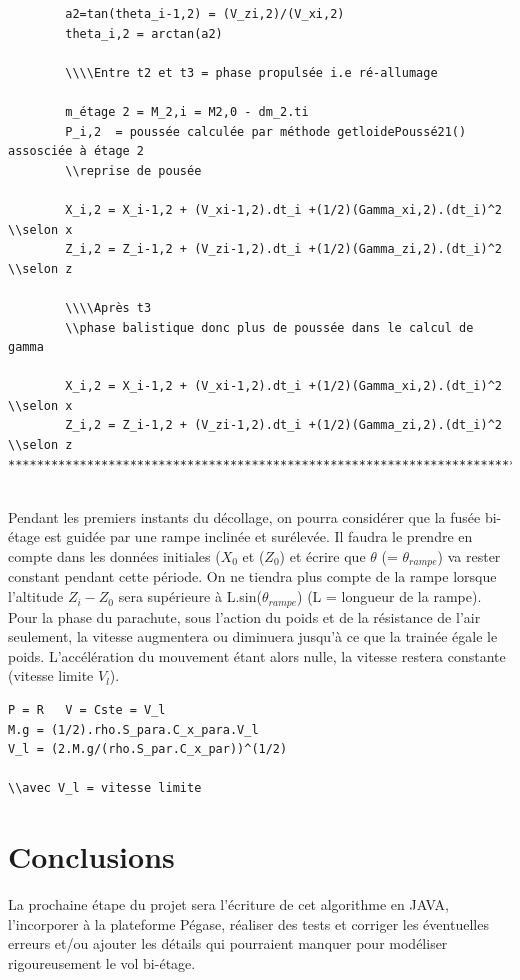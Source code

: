 \documentclass[a4paper]{article}
\begin{document}
\begin{verbatim}
		a2=tan(theta_i-1,2) = (V_zi,2)/(V_xi,2)
		theta_i,2 = arctan(a2)

		\\\\Entre t2 et t3 = phase propulsée i.e ré-allumage
		
		m_étage 2 = M_2,i = M2,0 - dm_2.ti
		P_i,2  = poussée calculée par méthode getloidePoussé21() assosciée à étage 2
		\\reprise de pousée
		
		X_i,2 = X_i-1,2 + (V_xi-1,2).dt_i +(1/2)(Gamma_xi,2).(dt_i)^2	\\selon x
		Z_i,2 = Z_i-1,2 + (V_zi-1,2).dt_i +(1/2)(Gamma_zi,2).(dt_i)^2	\\selon z
		
		\\\\Après t3
		\\phase balistique donc plus de poussée dans le calcul de gamma
		
		X_i,2 = X_i-1,2 + (V_xi-1,2).dt_i +(1/2)(Gamma_xi,2).(dt_i)^2	\\selon x
		Z_i,2 = Z_i-1,2 + (V_zi-1,2).dt_i +(1/2)(Gamma_zi,2).(dt_i)^2	\\selon z
*************************************************************************


\end{verbatim}

Pendant les premiers instants du décollage, on pourra considérer que la fusée bi-étage est guidée par une rampe inclinée et surélevée. Il faudra le prendre en compte dans les données initiales ($X_{0}$ et ($Z_{0}$) et écrire que $\theta$ (= $\theta_{rampe}$) va rester constant pendant cette période. On ne tiendra plus compte de la rampe lorsque l'altitude $Z_{i} - Z_{0}$ sera supérieure à L.sin($\theta_{rampe}$) (L = longueur de la rampe).\\

Pour la phase du parachute, sous l'action du poids et de la résistance de l'air seulement, la vitesse augmentera ou diminuera jusqu'à ce que la trainée égale le poids. L'accélération du mouvement étant alors nulle, la vitesse restera constante (vitesse limite $V_{l}$).

\begin{verbatim}
P = R   V = Cste = V_l 
M.g = (1/2).rho.S_para.C_x_para.V_l
V_l = (2.M.g/(rho.S_par.C_x_par))^(1/2)

\\avec V_l = vitesse limite

\end{verbatim}





\section{Conclusions}

La prochaine étape du projet sera l'écriture de cet algorithme en JAVA, l'incorporer à la plateforme Pégase, réaliser des tests et corriger les éventuelles erreurs et/ou ajouter les détails qui pourraient manquer pour modéliser rigoureusement le vol bi-étage.

%
%
\end{document}
